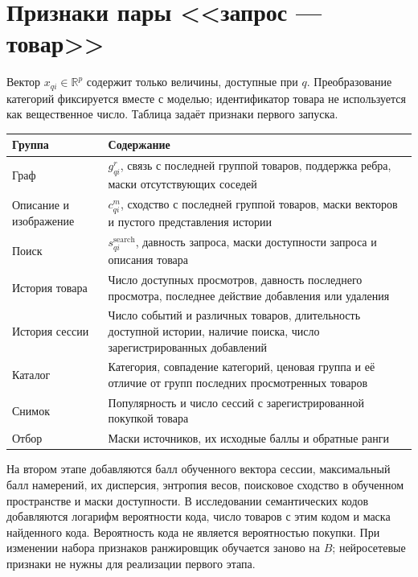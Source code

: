 \documentclass[12pt,a4paper]{article}
\newcommand{\R}{\mathbb R}
\theoremstyle{plainru}
\begin{document}
\section{Признаки пары <<запрос --- товар>>}\label{sec:model-features}

Вектор $x_{qi}\in\R^p$ содержит только величины, доступные при $q$.
Преобразование категорий фиксируется вместе с моделью;
идентификатор товара не используется как вещественное число.
Таблица задаёт признаки первого запуска.

{\small
\begin{longtable}{p{}p{}}
\toprule
Группа & Содержание \\
\midrule
Граф & $g^r_{qi}$, связь с последней группой товаров, поддержка ребра,
маски отсутствующих соседей \\
Описание и изображение & $c^m_{qi}$, сходство с последней группой товаров,
маски векторов и пустого представления истории \\
Поиск & $s_{qi}^{\mathrm{search}}$, давность запроса,
маски доступности запроса и описания товара \\
История товара & Число доступных просмотров, давность последнего
просмотра, последнее действие добавления или удаления \\
История сессии & Число событий и различных товаров, длительность
доступной истории, наличие поиска, число зарегистрированных добавлений \\
Каталог & Категория, совпадение категорий, ценовая группа
и её отличие от групп последних просмотренных товаров \\
Снимок & Популярность и число сессий с зарегистрированной покупкой товара \\
Отбор & Маски источников, их исходные баллы и обратные ранги \\
\bottomrule
\end{longtable}}

На втором этапе добавляются балл обученного вектора сессии,
максимальный балл намерений, их дисперсия, энтропия весов,
поисковое сходство в обученном пространстве и маски доступности.
В исследовании семантических кодов добавляются логарифм вероятности
кода, число товаров с этим кодом и маска найденного кода.
Вероятность кода не является вероятностью покупки.
При изменении набора признаков ранжировщик обучается заново на \(B\);
нейросетевые признаки не нужны для реализации первого этапа.
\end{document}
